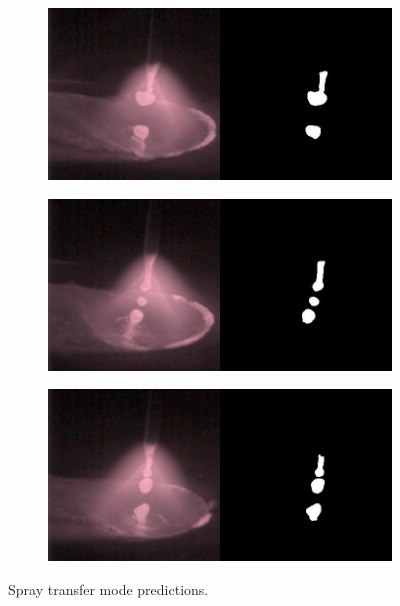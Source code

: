 \begin{figure}
\centering
  \begin{subfigure}[b]{0.45\textwidth}
    \includegraphics[width=\linewidth]{Images/Results/spray_pred_15.jpg}
    \caption{}

  \end{subfigure}
\hfill
  \begin{subfigure}[b]{0.45\textwidth}
    \includegraphics[width=\linewidth]{Images/Results/spray_pred_1937.jpg}
    \caption{}

  \end{subfigure}
  \begin{subfigure}[b]{0.45\textwidth}
    \includegraphics[width=\linewidth]{Images/Results/spray_pred_3269.jpg}
    \caption{}

  \end{subfigure}
    \caption[Spray transfer mode predictions]{Spray transfer mode predictions.}
    \label{fig:spray_pred_samples}
\end{figure}


